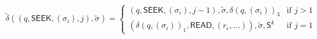 \documentclass[12pt]{article}
\begin{document}
\begin{multline*}
\tilde{\delta}
((q, \textsf{SEEK}, (\sigma_i), j), \tilde{\sigma}) =
\begin{cases}
(q, \textsf{SEEK}, (\sigma_i), j-1),  \tilde{\sigma}, \delta(q,(\sigma_i))_3 &
\text{if } j > 1 \\
(\delta(q,(\sigma_i))_1, \textsf{READ}, (r_{\epsilon},...)), \tilde{\sigma}, \textsf{S}^k &
\text{if } j = 1
\end{cases}
\end{multline*}
\end{document}
